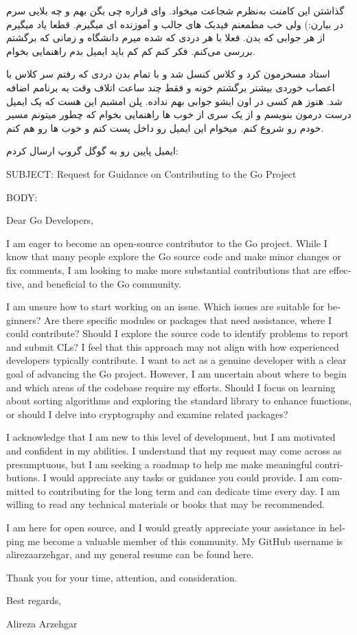 گذاشتن این کامنت به‌نظرم شجاعت میخواد. وای قراره چی بگن بهم و چه بلایی سرم در بیارن:) ولی خب مطمعنم فیدبک های جالب و آموزنده ای میگیرم.
قطعا یاد میگیرم از هر جوابی که بدن. فعلا با هر دردی که شده میرم دانشگاه و زمانی که برگشتم بررسی می‌کنم. فکر کنم کم کم باید ایمیل بدم راهنمایی
بخوام.

استاد مسخرمون کرد و کلاس کنسل شد و با تمام بدن دردی که رفتم سر کلاس با اعصاب خوردی بیشتر برگشتم خونه و فقط چند ساعت اتلاف وقت
به برنامم اضافه شد. هنوز هم کسی در اون ایشو جوابی بهم نداده. پلن امشبم این هست که یک ایمیل درست درمون بنویسم و از یک سری از خوب ها
راهنمایی بخوام که چطور میتونم مسیر خودم رو شروع کنم. میخوام این ایمیل رو داخل  پست کنم و خوب ها رو هم  کنم.

ایمیل پایین رو به گوگل گروپ  ارسال کردم:

\begin{latin}
SUBJECT: Request for Guidance on Contributing to the Go Project

BODY:

Dear Go Developers,

I am eager to become an open-source contributor to the Go project.
While I know that many people explore the Go source code and
make minor changes or fix comments, I am looking to make more substantial contributions
that are effective, and beneficial to the Go community.

I am unsure how to start working on an issue. Which issues are suitable for beginners?
Are there specific modules or packages that need assistance, where I could contribute?
Should I explore the source code to identify problems to report and submit CLs?
I feel that this approach may not align with how experienced developers typically contribute.
I want to act as a genuine developer with a clear goal of advancing the Go project.
However, I am uncertain about where to begin and which areas of the codebase require my efforts.
Should I focus on learning about sorting algorithms and exploring the standard library to enhance functions,
or should I delve into cryptography and examine related packages?

I acknowledge that I am new to this level of development, but I am motivated and confident in my abilities.
I understand that my request may come across as presumptuous, but I am seeking a roadmap
to help me make meaningful contributions. I would appreciate any tasks or guidance you could provide.
I am committed to contributing for the long term and can dedicate time every day.
I am willing to read any technical materials or books that may be recommended.

I am here for open source, and I would greatly appreciate your assistance
in helping me become a valuable member of this community.
 My GitHub username is alirezaarzehgar, and my general resume can be found here.

Thank you for your time, attention, and consideration.

Best regards,

Alireza Arzehgar
\end{latin}

